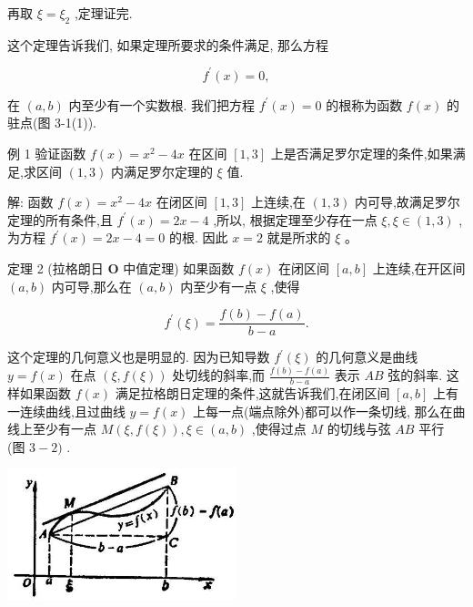 \documentclass[lang=cn,newtx,10pt,scheme=chinese]{elegantbook}
\begin{document}
再取 \(\xi = {\xi }_{2}\) ,定理证完.

这个定理告诉我们, 如果定理所要求的条件满足, 那么方程

\[
{f}^{\prime }\left( x\right) = 0,
\]

在 \(\left( {a,b}\right)\) 内至少有一个实数根. 我们把方程 \({f}^{\prime }\left( x\right) = 0\) 的根称为函数 \(f\left( x\right)\) 的驻点(图 3-1(1)).

例 1 验证函数 \(f\left( x\right) = {x}^{2} - {4x}\) 在区间 \(\left\lbrack {1,3}\right\rbrack\) 上是否满足罗尔定理的条件,如果满足,求区间 \(\left( {1,3}\right)\) 内满足罗尔定理的 \(\xi\) 值.

解: 函数 \(f\left( x\right) = {x}^{2} - {4x}\) 在闭区间 \(\left\lbrack {1,3}\right\rbrack\) 上连续,在 \(\left( {1,3}\right)\) 内可导,故满足罗尔定理的所有条件,且 \({f}^{\prime }\left( x\right) = {2x} - 4\) ,所以, 根据定理至少存在一点 \(\xi ,\xi \in \left( {1,3}\right)\) ,为方程 \({f}^{\prime }\left( x\right) = {2x} - 4 = 0\) 的根. 因此 \(x = 2\) 就是所求的 \(\xi\) 。

定理 2 (拉格朗日 \(\mathbf{O}\) 中值定理) 如果函数 \(f\left( x\right)\) 在闭区间 \(\left\lbrack {a,b}\right\rbrack\) 上连续,在开区间 \(\left( {a,b}\right)\) 内可导,那么在 \(\left( {a,b}\right)\) 内至少有一点 \(\xi\) ,使得

\[
{f}^{\prime }\left( \xi \right) = \frac{f\left( b\right) - f\left( a\right) }{b - a}.
\]

这个定理的几何意义也是明显的. 因为已知导数 \({f}^{\prime }\left( \xi \right)\) 的几何意义是曲线 \(y = f\left( x\right)\) 在点 \(\left( {\xi ,f\left( \xi \right) }\right)\) 处切线的斜率,而 \(\frac{f\left( b\right) - f\left( a\right) }{b - a}\) 表示 \({AB}\) 弦的斜率. 这样如果函数 \(f\left( x\right)\) 满足拉格朗日定理的条件,这就告诉我们,在闭区间 \(\left\lbrack {a,b}\right\rbrack\) 上有一连续曲线,且过曲线 \(y = f\left( x\right)\) 上每一点(端点除外)都可以作一条切线, 那么在曲线上至少有一点 \(M\left( {\xi ,f\left( \xi \right) }\right) ,\xi \in \left( {a,b}\right)\) ,使得过点 \(M\) 的切线与弦 \({AB}\) 平行 (图 \(3 - 2)\) .

\begin{center}
\includegraphics[max width=0.5\textwidth]{images/01912c18-5c3f-733d-b775-749ba9897a9d_133_982068.jpg}
\end{center}
\end{document}
